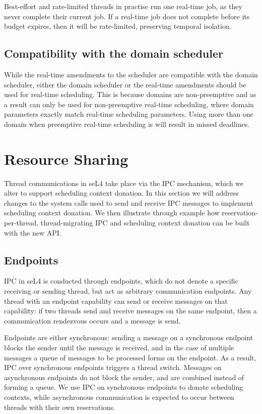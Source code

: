Best-effort and rate-limited threads in practise run one real-time job, as they never complete their current job.
If a real-time job does not complete before its budget expires, then it will be rate-limited, preserving temporal isolation.

\subsection{Compatibility with the domain scheduler}

While the real-time amendments to the scheduler are compatible with the domain scheduler, either the domain scheduler or the real-time amendments should be used for real-time scheduling.
This is because domains are non-preemptive and as a result can only be used for non-preemptive real-time scheduling, where domain parameters exactly match real-time scheduling parameters.
Using more than one domain when preemptive real-time scheduling is will result in missed deadlines.



\section{Resource Sharing}

Thread communications in seL4 take place via the IPC mechanism, which we alter to support scheduling context donation.
In this section we will address changes to the system calls used to send and receive IPC messages to implement scheduling context donation.
We then illustrate through example how reservation-per-thread, thread-migrating IPC and scheduling context donation can be built with the new \gls{API}.

\subsection{Endpoints}

\Gls{IPC} in seL4 is conducted through endpoints, which do not denote a specific receiving or sending thread, but act as arbitrary communication endpoints.
Any thread with an endpoint capability can send or receive messages on that capability: if two threads send and receive messages on the same endpoint, then a communication rendezvous occurs and a message is send.

Endpoints are either synchronous: sending a message on a synchronous endpoint blocks the sender until the message is received, and in the case of multiple messages a queue of messages to be processed forms on the endpoint.
As a result, IPC over synchronous endpoints triggers a thread switch.
Messages on asynchronous endpoints do not block the sender, and are combined instead of forming a queue.
We use IPC on synchronous endpoints to donate scheduling contexts, while asynchronous communication is expected to occur between threads with their own reservations.

